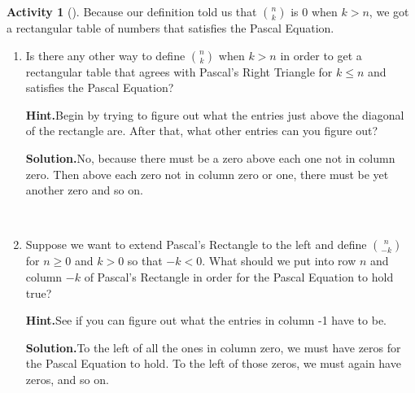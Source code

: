 \documentclass[10pt,]{book}
\theoremstyle{plain}
\theoremstyle{definition}
\newtheorem{activity}[project]{Activity}
\numberwithin{equation}{chapter}
\newcommand{\lt}{<}
\begin{document}
\begin{activity}[]\label{activity-32}
Because our definition told us that \(\binom{n}{k}\) is 0 when \(k>n\), we got a rectangular table of numbers that satisfies the Pascal Equation.%
~\par
\begin{enumerate}[label=(\alph*)]
 \item Is there any other way to define \(n \choose k\) when \(k>n\) in order to get a rectangular table that agrees with Pascal's Right Triangle for \(k\le n\) and satisfies the Pascal Equation?%
\par\medskip\noindent%
\textbf{Hint.}\quad Begin by trying to figure out what the entries just above the diagonal of the rectangle are. After that, what other entries can you figure out?\par\medskip\noindent%
\textbf{Solution.}\quad No, because there must be a zero above each one not in column zero. Then above each zero not in column zero or one, there must be yet another zero and so on.%

~\par
\item Suppose we want to extend Pascal's Rectangle to the left and define \(n\choose -k\) for \(n\ge 0\) and \(k>0\) so that \(-k\lt 0\). What should we put into row \(n\) and column \(-k\) of Pascal's Rectangle in order for the Pascal Equation to hold true?%
\par\medskip\noindent%
\textbf{Hint.}\quad See if you can figure out what the entries in column -1 have to be.\par\medskip\noindent%
\textbf{Solution.}\quad To the left of all the ones in column zero, we must have zeros for the Pascal Equation to hold. To the left of those zeros, we must again have zeros, and so on.%


\end{enumerate}
\end{activity}
\end{document}

